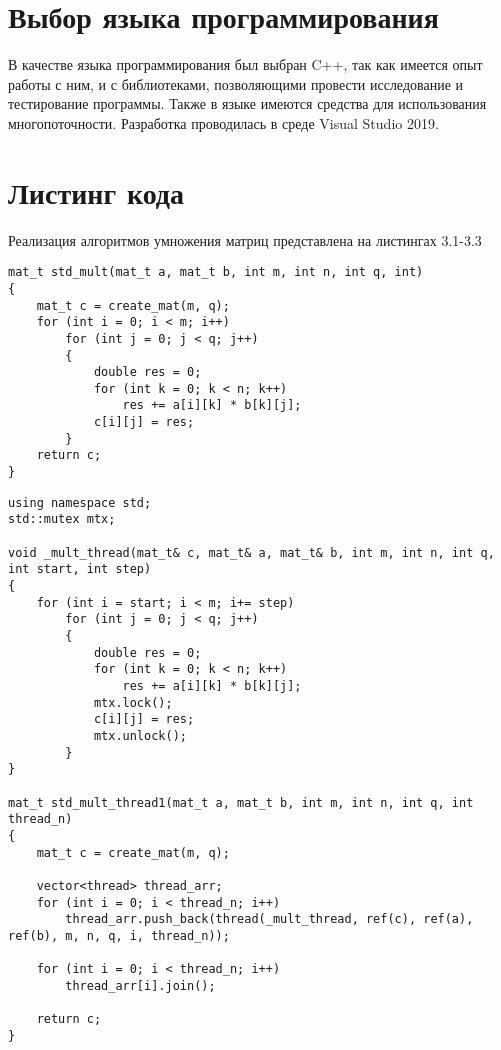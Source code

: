 \section{Выбор языка программирования}
В качестве языка программирования был выбран C++\cite{C++_Doc}, так как имеется опыт работы с ним, и с библиотеками, позволяющими провести исследование и тестирование программы. Также в языке имеются средства для использования многопоточности. Разработка проводилась в среде Visual Studio 2019\cite{VisualStudio}.


\section{Листинг кода}
Реализация алгоритмов умножения матриц представлена на листингах 3.1-3.3

\begin{lstlisting}[caption = {Функция однопоточного умножения матриц}, captionpos=b]
mat_t std_mult(mat_t a, mat_t b, int m, int n, int q, int)
{
	mat_t c = create_mat(m, q);
	for (int i = 0; i < m; i++)
		for (int j = 0; j < q; j++)
		{
			double res = 0;
			for (int k = 0; k < n; k++)
				res += a[i][k] * b[k][j];
			c[i][j] = res;
		}
	return c;
}
\end{lstlisting}

\begin{lstlisting}[caption = {Функция умножения матриц (параллельная по строкам)}, captionpos=b]
using namespace std;
std::mutex mtx;

void _mult_thread(mat_t& c, mat_t& a, mat_t& b, int m, int n, int q, int start, int step)
{
	for (int i = start; i < m; i+= step)
		for (int j = 0; j < q; j++)
		{
			double res = 0;
			for (int k = 0; k < n; k++)
				res += a[i][k] * b[k][j];
			mtx.lock();
			c[i][j] = res;
			mtx.unlock();
		}
}

mat_t std_mult_thread1(mat_t a, mat_t b, int m, int n, int q, int thread_n)
{
	mat_t c = create_mat(m, q);
	
	vector<thread> thread_arr;
	for (int i = 0; i < thread_n; i++)
		thread_arr.push_back(thread(_mult_thread, ref(c), ref(a), ref(b), m, n, q, i, thread_n));
	
	for (int i = 0; i < thread_n; i++)
		thread_arr[i].join();
	
	return c;
}
\end{lstlisting}

